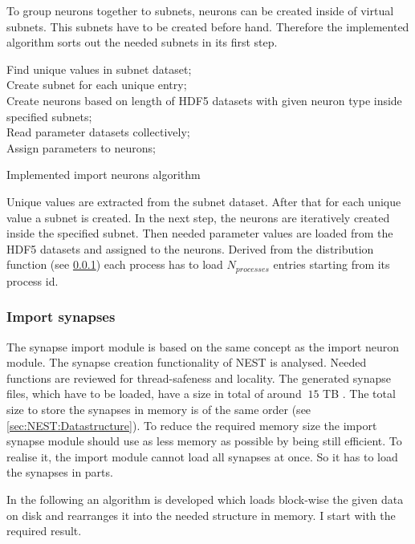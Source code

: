 To group neurons together to subnets, neurons can be created inside of virtual subnets.
This subnets have to be created before hand.
Therefore the implemented algorithm sorts out the needed subnets in its first step.
\begin{algorithm}[ht!]
 Find unique values in subnet dataset; \\
 Create subnet for each unique entry; \\
 Create neurons based on length of HDF5 datasets with given neuron type inside specified subnets; \\
 Read parameter datasets collectively; \\
 Assign parameters to neurons;
\label{alg2}
\caption{Implemented import neurons algorithm}
\end{algorithm}
Unique values are extracted from the subnet dataset.
After that for each unique value a subnet is created.
In the next step, the neurons are iteratively created inside the specified subnet.
Then needed parameter values are loaded from the HDF5 datasets and assigned to the neurons.
Derived from the distribution function (see \ref{}) each process has to load $N_{processes}$
entries starting from its process id.

\newpage
\subsubsection{Import synapses}
The synapse import module is based on the same concept as the import neuron module.
The synapse creation functionality of NEST is analysed.
Needed functions are reviewed for thread-safeness and locality.
The generated synapse files, which have to be loaded, have a size in total of around $~15$ TB .
The total size to store the synapses in memory is of the same order (see \ref{sec:NEST:Datastructure}).
To reduce the required memory size the import synapse module should use as less memory
as possible by being still efficient.
To realise it, the import module cannot load all synapses at once.
So it has to load the synapses in parts.

In the following an algorithm is developed which loads block-wise the given data on disk and rearranges it into
the needed structure in memory. I start with the required result.

